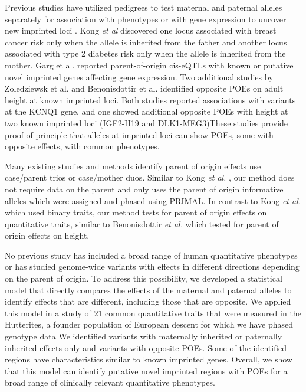 Previous studies have utilized pedigrees to test maternal and paternal alleles separately for association with phenotypes or with gene expression to uncover new imprinted loci \citep{Kong:2009kk,Baran:2015cx,Garg2012a,Paper2014b,Benonisdottir:2016dz}. Kong \emph{et al} \citep{Kong:2009kk} discovered one locus associated with breast cancer risk only when the allele is inherited from the father and another locus associated with type 2 diabetes risk only when the allele is inherited from the mother. Garg et al. reported parent-of-origin cis-eQTLs with known or putative novel imprinted genes affecting gene expression\citep{Garg2012a}. Two additional studies by Zoledziewsk et al. and Benonisdottir et al. identified opposite POEs on adult height at known imprinted loci\citep{Zoledziewska:2015do,Benonisdottir:2016dz}. Both studies reported associations with variants at the KCNQ1 gene, and one showed additional opposite POEs with height at two known imprinted loci (IGF2-H19 and DLK1-MEG3)\citep{Benonisdottir:2016dz}These studies provide proof-of-principle that alleles at imprinted loci can show POEs, some with opposite effects, with common phenotypes. 

Many existing studies and methods identify parent of origin effects use case/parent trios or case/mother duos\citep{Chuang:2017kp,Howey:2012hj,Ainsworth:2010bp,Weinberg:1999km,Weinberg:1998cf}. Similar to Kong \emph{et al.} \citep{Kong:2009kk}, our method does not require data on the parent and only uses the parent of origin informative alleles which were assigned and phased using PRIMAL\citep{Livne2015}.  In contrast to Kong \emph{et al.} \citep{Kong:2009kk} which used binary traits, our method tests for parent of origin effects on quantitative traits, similar to Benonisdottir \emph{et al.} \citep{Benonisdottir:2016dz} which tested for parent of origin effects on height.

No previous study has included a broad range of human quantitative phenotypes or has studied genome-wide variants with effects in different directions depending on the parent of origin. To address this possibility, we developed a statistical model that directly compares the effects of the maternal and paternal alleles to identify effects that are different, including those that are opposite. We applied this model in a study of 21 common quantitative traits that were measured in the Hutterites, a founder population of European descent for which we have phased genotype data \citep{Livne2015} We identified variants with maternally inherited or paternally inherited effects only and variants with opposite POEs. Some of the identified regions have characteristics similar to known imprinted genes. Overall, we show that this model can identify putative novel imprinted regions with POEs for a broad range of clinically relevant quantitative phenotypes.

